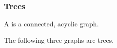 \documentclass[11pt, mathserif]{beamer}
\theoremstyle{definition}
\theoremstyle{remark}
\begin{document}
\begin{frame}
  \frametitle{Trees}

  \begin{definition}[Tree]
    A  is a connected, acyclic graph.
  \end{definition}
  
  \begin{example}
    The following three graphs are trees.
    \begin{center}
      


\begin{tikzpicture}[x=0.75pt,y=0.75pt,yscale=-1,xscale=1]


\end{tikzpicture}
\end{center}
\end{example}
\end{frame}
\end{document}
